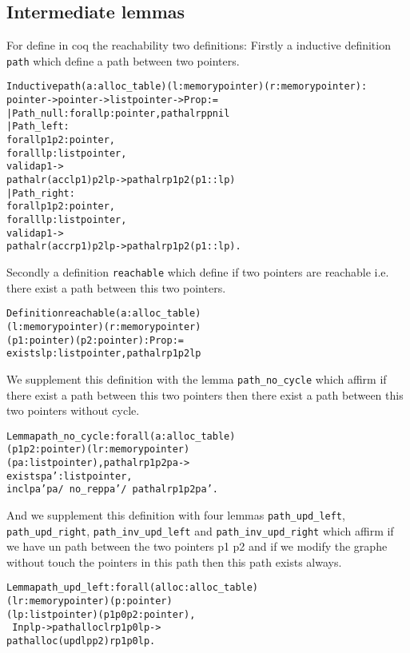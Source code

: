 \subsection{Intermediate lemmas}
For define in coq the reachability two definitions:
Firstly a inductive definition  \texttt{path} which define a path between two pointers.
\begin{alltt}
\begin{slshape}
Inductive path (a: alloc_table) (l: memory pointer)(r: memory pointer) : 
pointer ->  pointer -> list pointer -> Prop :=
  | Path_null : forall p:pointer, path a l r p  p nil
  | Path_left :
      forall p1 p2:pointer,
      forall lp : list pointer,
        valid a p1 ->
          path a l r (acc l p1) p2 lp-> path a l r p1  p2 (p1::lp)
  | Path_right :
      	forall p1 p2:pointer,
      forall lp : list pointer ,
        	valid a p1 ->
        	  path a l r (acc r p1)  p2 lp -> path a l r p1 p2 (p1::lp). 
\end{slshape}
\end{alltt}
Secondly a definition  \texttt{reachable} which define if two pointers are
reachable i.e. there exist a path between this two pointers.
\begin{alltt}
\begin{slshape}
Definition reachable (a: alloc_table) 
  (l: memory pointer)(r: memory pointer) 
  (p1 :pointer) (p2:pointer) : Prop :=
  exists lp : list pointer, path a l r p1 p2 lp
\end{slshape}
\end{alltt}

We supplement this definition with the lemma
\texttt{path\_no\_cycle} which affirm if
there exist a path between this two pointers then there exist a path
between this two pointers without cycle.
\begin{alltt}
\begin{slshape}
Lemma path_no_cycle : forall (a : alloc_table) 
  (p1 p2 : pointer) (l r : memory pointer) 
  (pa : list pointer), path a l r p1 p2 pa -> 
  exists pa' :list pointer, 
  incl pa' pa /\ no_rep pa' /\ path a l r p1 p2 pa'. 
\end{slshape}
\end{alltt}

And we supplement this definition with four lemmas
\texttt{path\_upd\_left}, \texttt{path\_upd\_right},
\texttt{path\_inv\_upd\_left} and \texttt{path\_inv\_upd\_right} which
affirm if we have un path between the two pointers p1 p2 and if we
modify the graphe without touch the pointers in this path then this
path exists always. 
\begin{alltt}
\begin{slshape}
Lemma path_upd_left : forall (alloc : alloc_table) 
  (l r : memory pointer) (p:pointer)
  (lp : list pointer) (p1 p0 p2 : pointer), 
  ~ In p lp -> path alloc l r p1 p0 lp -> 
  path alloc (upd l p p2) r p1 p0 lp.
\end{slshape}
\end{alltt}



